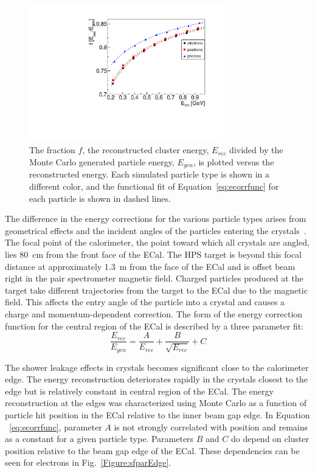 \begin{figure}[thb]
  \centering
      \includegraphics[width=0.75\textwidth]{pics/performance/energycorrection.pdf}
  \caption[ECal energy shower correction functions derived from simulation]{The fraction $f$, the reconstructed cluster energy, $E_{rec}$ divided by the Monte Carlo generated particle energy, $E_{gen}$, is plotted versus the reconstructed energy. Each simulated particle type is shown in a different color, and the functional fit of Equation~\eqref{eq:ecorrfunc} for each particle is shown in dashed lines.}
  \label{Figure:ecorr}
\end{figure}

The difference in the energy corrections for the various particle types arises from geometrical effects and the incident angles of the particles entering the crystals~\cite{szumila-vance_hps_ecal_2014}. The focal point of the calorimeter, the point toward which all crystals are angled, lies 80~cm from the front face of the ECal. The HPS target is beyond this focal distance at approximately 1.3~m from the face of the ECal and is offset beam right in the pair spectrometer magnetic field. Charged particles produced at the target take different trajectories from the target to the ECal due to the magnetic field. This affects the entry angle of the particle into a crystal and causes a charge and momentum-dependent correction. The form of the energy correction function for the central region of the ECal is described by a three parameter fit:\\

\begin{equation}
	\label{eq:ecorrfunc}
	\dfrac{E_{rec}}{E_{gen}} = \dfrac{A}{E_{rec}}+\dfrac{B}{\sqrt{E_{rec}}}+C 
\end{equation}

The shower leakage effects in crystals becomes significant close to the calorimeter edge. The energy reconstruction deteriorates rapidly in the crystals closest to the edge but is relatively constant in central region of the ECal. The energy reconstruction at the edges was characterized using Monte Carlo as a function of particle hit position in the ECal relative to the inner beam gap edge. In Equation ~\eqref{eq:ecorrfunc}, parameter $A$ is not strongly correlated with position and remains as a constant for a given particle type. Parameters $B$ and $C$  do depend on cluster position relative to the beam gap edge of the ECal. These dependencies can be seen for electrons in Fig.~\ref{Figure:sfparEdge}.

